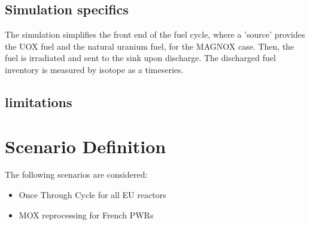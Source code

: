 \subsection{Simulation specifics}
The simulation simplifies the front end of the fuel cycle,
where a 'source' provides the \gls{UOX} fuel and the natural
uranium fuel, for the \gls{MAGNOX} case. Then, the fuel is
irradiated and sent to the sink upon discharge. The discharged
fuel inventory is measured by isotope as a timeseries.

\subsection{limitations}


\section{Scenario Definition}
The following scenarios are considered: 
\begin{itemize}
	\item Once Through Cycle for all EU reactors
	\item \gls{MOX} reprocessing for French \gls{PWR}s
\end{itemize}
